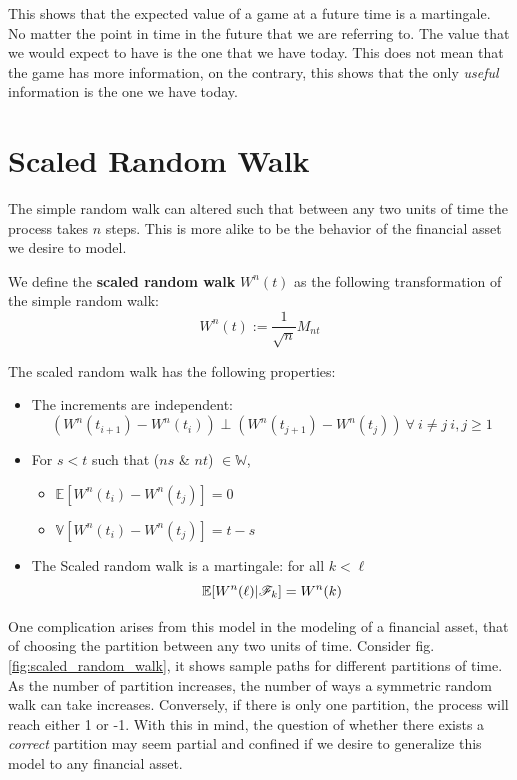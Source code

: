 \documentclass[../TGMAFFIRO]{subfiles}
\begin{document}
This shows that the expected value of a game at a future time is a martingale. No matter the point in time in the future that we are referring to. The value that we would expect to have is the one that we have today. This does not mean that the game has more information, on the contrary, this shows that the only \textit{useful} information is the one we have today. \\


\section{Scaled Random Walk}
The simple random walk can altered such that between any two units of time the process takes $n$ steps. This is more alike to be the behavior of the financial asset we desire to model. 

\begin{definition}
	We define the \textbf{scaled random walk} $W^n(t)$ as the following transformation of the simple random walk:
	\[W^n(t) := \frac{1}{\sqrt{n}}M_{nt}\]
\end{definition}

\begin{remark}
	The scaled random walk has the following properties:
	\begin{itemize}
		\item The increments are independent: \[\left(W^n(t_{i+1}) - W^n(t_{i})\right) \perp \left(W^n(t_{j+1}) - W^n(t_{j})\right) \ \forall \ i \neq j \ i, j \geq 1\]
		\item For $s < t$ such that ($ns$ \& $nt$) $\in \mathbb{W}$, 
		\begin{itemize}
			\item $\mathbb{E}[W^n(t_{i}) - W^n(t_{j})] = 0$ 
			\item $\mathbb{V}[W^n(t_{i}) - W^n(t_{j})] = t - s$
		\end{itemize}
		\item The Scaled random walk is a martingale: for all $k < \ell$
		\[\mathbb{E}[W^n(\ell) | \mathscr{F}_k] = W^n(k)\]
	\end{itemize}
\end{remark}

One complication arises from this model in the modeling of a financial asset, that of choosing the partition between any two units of time. Consider fig. \ref{fig:scaled_random_walk}, it shows sample paths for different partitions of time. As the number of partition increases, the number of ways a symmetric random walk can take increases. Conversely, if there is only one partition, the process will reach either 1 or -1. With this in mind, the question of whether there exists a \textit{correct} partition may seem partial and confined if we desire to generalize this model to any financial asset.\\
\end{document}
